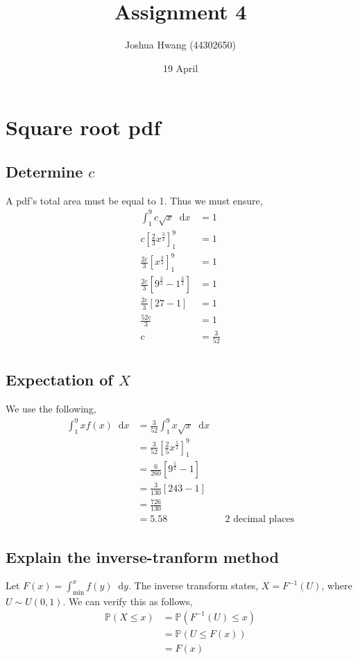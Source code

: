 \documentclass{article}
\title{Assignment 4}
\author{Joshua Hwang (44302650)}
\date{19 April}
\newcommand{\diff}{\mathop{}\!\mathrm{d}}
\newcommand{\prob}{\mathbb{P}}
\begin{document}
\maketitle

\section{Square root pdf}
\subsection{Determine $c$}
A pdf's total area must be equal to 1.
Thus we must ensure,
\begin{align*}
    \int_1^9 c\sqrt{x} \diff x &= 1 \\
    c \left[\frac{2}{3} x^{\frac{3}{2}}\right]_1^9 &= 1 \\
    \frac{2c}{3} \left[x^{\frac{3}{2}}\right]_1^9 &= 1 \\
    \frac{2c}{3} \left[9^{\frac{3}{2}} - 1^{\frac{3}{2}}\right] &= 1 \\
    \frac{2c}{3} \left[27 - 1\right] &= 1 \\
    \frac{52c}{3} &= 1 \\
    c &= \frac{3}{52} \\
\end{align*}

\subsection{Expectation of $X$}
We use the following,
\begin{align*}
    \int_1^9 xf(x) \diff x &= \frac{3}{52}\int_1^9 x\sqrt{x} \diff x \\
    &= \frac{3}{52} \left[\frac{2}{5}x^\frac{5}{2}\right]_1^9 \\
    &= \frac{6}{260} \left[9^\frac{5}{2} - 1\right] \\
    &= \frac{3}{130} \left[243 - 1\right] \\
    &= \frac{726}{130} \\
    &= 5.58 && \text{2 decimal places}
\end{align*}

\subsection{Explain the inverse-tranform method}
Let $F(x) = \int_\text{min}^x f(y) \diff y$. The inverse transform states,
$X = F^{-1}(U)$, where $U \sim U(0,1)$. We can verify this as follows,
\begin{align*}
    \prob(X \leq x) &= \prob(F^{-1}(U) \leq x) \\
    &= \prob(U \leq F(x)) \\
    &= F(x) \\
\end{align*}
\end{document}
